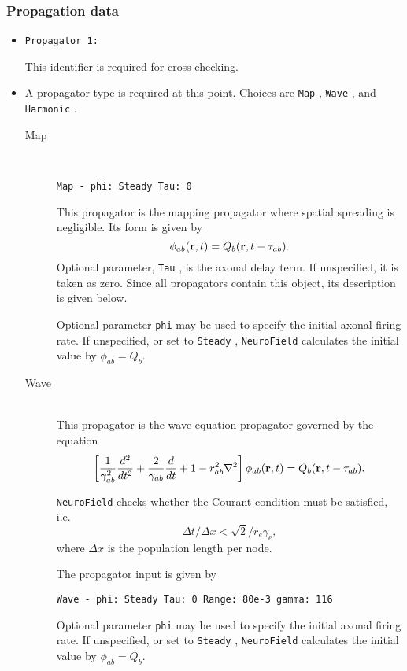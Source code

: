 \documentclass[12pt,a4paper]{article}
\newcommand{\type}[1]{{\small\small\tt #1} }
\newcommand{\NF}[0]{\type{NeuroField}}
\begin{document}
\subsubsection{Propagation data}
\label{sec:prop}
\begin{itemize}
\item
    \begin{lstlisting}
Propagator 1:
    \end{lstlisting}
    This identifier is required for cross-checking.
\item A propagator type is required at this point. Choices are \type{Map}, \type{Wave}, and \type{Harmonic}.
\begin{description}
    \item[Map]\ \\
    \begin{lstlisting}
Map - phi: Steady Tau: 0
    \end{lstlisting}
    This propagator is the mapping propagator where spatial spreading is negligible. Its form is given by
    \[\phi_{ab}({\bf r}, t) = Q_b ({\bf r}, t - \tau_{ab}).\]
    Optional parameter, \type{Tau}, is the axonal delay term. If unspecified, it is taken as zero. Since all propagators contain this object, its description is given below.

    Optional parameter \type{phi} may be used to specify the initial axonal firing rate. If unspecified, or set to \type{Steady}, \NF calculates the initial value by \(\phi_{ab}=Q_{b}\).

    \item[Wave]\ \\
    This propagator is the wave equation propagator governed by the equation
    \[\left[\frac{1}{\gamma_{ab}^2}\frac{d^2}{d t^2}+\frac{2}{\gamma_{ab}}\frac{d} {d t}+1 -r^2_{ab}\nabla^2 \right] \phi_{ab}({\bf r},t) =Q_b({\bf r},t-\tau_{ab}).\]

    \NF checks whether the Courant condition must be satisfied, i.e. \[\Delta t/\Delta x<\sqrt{2}/r_e\gamma_e,\] where $\Delta x$ is the population length per node.

    The propagator input is given by
    \begin{lstlisting}
Wave - phi: Steady Tau: 0 Range: 80e-3 gamma: 116
    \end{lstlisting}

    Optional parameter \type{phi} may be used to specify the initial axonal firing rate. If unspecified, or set to \type{Steady}, \NF calculates the initial value by \(\phi_{ab}=Q_{b}\).


\end{description}
\end{itemize}
\end{document}
